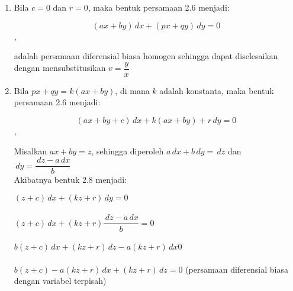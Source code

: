 \begin{enumerate}[1.]

	\item Bila \begin{math} c = 0 \end{math} dan \begin{math} r = 0 \end{math}, maka bentuk persamaan 2.6 menjadi:

	         \begin{equation} (ax + by) \, dx + (px + qy) \,dy = 0 \end{equation},

	         adalah persamaan diferensial biasa homogen sehingga dapat diselesaikan dengan mensubstitusikan \begin{math} v = \dfrac{y}{x} \end{math} 

	\item Bila \begin{math} px + qy = k (ax + by) \end{math}, di mana \begin{math} k \end{math} adalah konstanta, maka bentuk persamaan 2.6 menjadi:

                   \begin{equation} (ax + by + c) \, dx + k (ax + by) + r \,dy = 0 \end{equation},

                   Misalkan \begin{math} ax + by = z \end{math}, sehingga diperoleh \begin{math} a \, dx + b \, dy = \, dz \end{math} dan \begin{math} \, dy = \dfrac{\, dz - a \, dx}{b} \end{math}
	        \\
                   Akibatnya bentuk 2.8 menjadi:
  
	        \begin{math} (z + c) \,dx + (kz + r) \, dy = 0 \end{math} \\ \\
                   \begin{math}  (z + c) \,dx + (kz + r)  \dfrac{\, dz - a \, dx}{b} = 0 \end{math} \\ \\
                   \begin{math} b (z+ c) \,dx + (kz + r) \, dz - a (kz + r) \,dx  0 \end{math} \\ \\
                   \begin{math} b (z + c) - a (kz + r) \, dx + (kz + r) \, dz = 0 \end{math} (persamaan diferensial biasa dengan variabel terpisah)


\end{enumerate}

